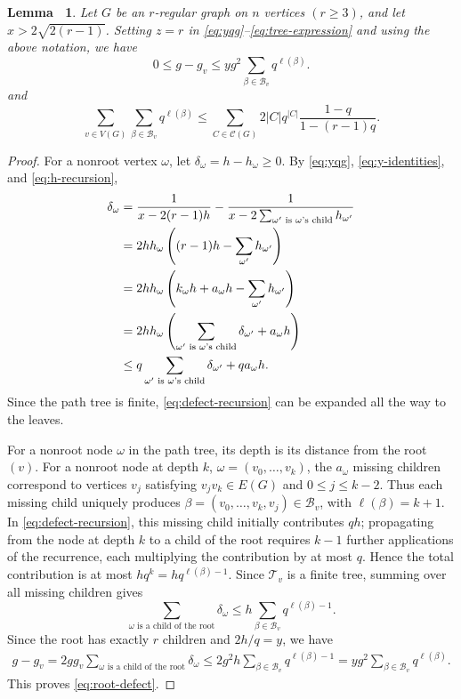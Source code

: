 \documentclass[11pt, a4paper]{article}
\theoremstyle{plain}
\newtheorem{lemma}{Lemma\ }[section]
\begin{document}
\begin{lemma}\label{lem:root-defect}
Let $G$ be an $r$-regular graph on $n$ vertices $(r\ge3)$,
and let $x>2\sqrt{2(r-1)}$.
Setting $z=r$ in \eqref{eq:yqg}--\eqref{eq:tree-expression}
and using the above notation, we have
\begin{equation}\label{eq:root-defect}
 0\leq g-g_v\leq y g^2\sum_{\beta\in\mathcal{B}_v}q^{\ell(\beta)}.
\end{equation}
and
\begin{equation}\label{eq:blocked-count}
 \sum_{v\in V(G)}\sum_{\beta\in\mathcal{B}_v}q^{\ell(\beta)}
 \leq\sum_{C\in\mathcal{C}(G)}
       2|C|q^{|C|}\frac{1-q}{1-(r-1)q}.
\end{equation}
\end{lemma}

\begin{proof}
For a nonroot vertex $\omega$, let $\delta_\omega=h-h_\omega\geq0$.
By \eqref{eq:yqg}, \eqref{eq:y-identities}, and \eqref{eq:h-recursion},
\begin{align}
 \delta_\omega
 &=\frac1{x-2(r-1)h} - \frac1{x-2\sum_{\omega'\text{ is }\omega\text{'s child}}h_{\omega'}} \notag \\
 &=2hh_\omega\left((r-1)h-\sum_{\omega'}h_{\omega'}\right) \notag \\
 &=2hh_\omega\left(k_\omega h+a_\omega h-\sum_{\omega'}h_{\omega'}\right) \notag \\
 &=2hh_\omega\left(\sum_{\omega'\text{ is }\omega\text{'s child}}\delta_{\omega'} + a_\omega h\right) \notag \\
 &\leq q\sum_{\omega'\text{ is }\omega\text{'s child}}\delta_{\omega'} + q a_\omega h. \label{eq:defect-recursion}
\end{align}
Since the path tree is finite, \eqref{eq:defect-recursion} can be expanded all the way to the leaves.

For a nonroot node $\omega$ in the path tree,
its depth is its distance from the root $(v)$.
For a nonroot node at depth $k$,
$\omega=(v_0,\ldots,v_k)$,
the $a_\omega$ missing children correspond to vertices $v_j$ satisfying
$v_jv_k\in E(G)$ and $0\le j\le k-2$.
Thus each missing child uniquely produces
$\beta=(v_0,\ldots,v_k,v_j)\in \mathcal{B}_v$,
with $\ell(\beta)=k+1$.
In \eqref{eq:defect-recursion}, this missing child initially contributes $qh$;
propagating from the node at depth $k$ to a child of the root requires $k-1$ further applications of the recurrence,
each multiplying the contribution by at most $q$. Hence the total contribution is at most
$hq^k=hq^{\ell(\beta)-1}$.
Since $\mathcal{T}_v$ is a finite tree, summing over all missing children gives
\[
 \sum_{\omega\text{ is a child of the root}}\delta_\omega
 \leq h\sum_{\beta\in\mathcal{B}_v}q^{\ell(\beta)-1}.
\]
Since the root has exactly $r$ children and $2h/q=y$, we have
\begin{align*}
 g-g_v
 =2gg_v\sum_{\omega\text{ is a child of the root}}\delta_\omega
 \leq2g^2h\sum_{\beta\in\mathcal{B}_v}q^{\ell(\beta)-1}
 =yg^2\sum_{\beta\in\mathcal{B}_v}q^{\ell(\beta)}.
\end{align*}
This proves \eqref{eq:root-defect}.


\end{proof}
\end{document}
